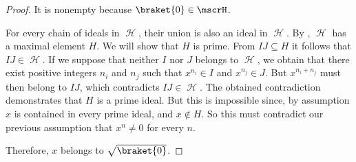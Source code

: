 \begin{proof}
  It is nonempty because \( \braket{0} \in \mscrH \).

  For every chain of ideals in \( \mscrH \), their union is also an ideal in \( \mscrH \). By , \( \mscrH \) has a maximal element \( H \). We will show that \( H \) is prime. From \( IJ \subseteq H \) it follows that \( IJ \in \mscrH \). If we suppose that neither \( I \) nor \( J \) belongs to \( \mscrH \), we obtain that there exist positive integers \( n_i \) and \( n_j \) such that \( x^{n_i} \in I \) and \( x^{n_j} \in J \). But \( x^{n_i + n_j} \) must then belong to \( IJ \), which contradicts \( IJ \in \mscrH \). The obtained contradiction demonstrates that \( H \) is a prime ideal. But this is impossible since, by assumption \( x \) is contained in every prime ideal, and \( x \not\in H \). So this must contradict our previous assumption that \( x^n \neq 0 \) for every \( n \).

  Therefore, \( x \) belongs to \( \sqrt{\braket{0}} \).
\end{proof}
